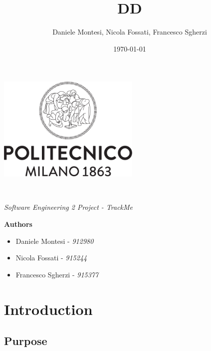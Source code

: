 \documentclass[a4paper,oneside,11pt]{article}
\title{DD}
\author{Daniele Montesi, Nicola Fossati, Francesco Sgherzi}
\date{\today}
\begin{document}
    \begin{titlingpage} 
        \begin{center}
            \includegraphics[height=5cm]{assets/Logo_Politecnico_Milano.png}\\
            \vspace{4cm}
            \begin{huge} 
                \textbf{\thetitle} \\
            \end{huge}
            \vspace{0.3cm}
            \begin{Large}
                \textit{Software Engineering 2 Project - TrackMe} \\
            \end{Large}
        \end{center}
        \begin{large}
            \vspace{4cm}
            \textbf{Authors}
            \begin{itemize}
                \item Daniele Montesi - \textit{912980} 
                \item Nicola Fossati - \textit{915244}
                \item Francesco Sgherzi - \textit{915377}
            \end{itemize}
        \end{large}
    \end{titlingpage}
    \newpage
    \tableofcontents
    \newpage
    \section{Introduction}
    
        \subsection{Purpose}
            
\end{document}
